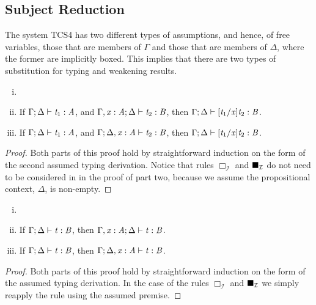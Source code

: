 \subsection{Subject Reduction}
\label{subsec:subject_reduction}
The system TCS4 has two different types of assumptions, and hence, of
free variables, those that are members of $\Gamma$ and those that are
members of $\Delta$, where the former are implicitly boxed.  This
implies that there are two types of substitution for typing and
weakening results.
\begin{lemma}
  \label{lemma:substitution_for_typing}
  \begin{enumerate}[i.]
  \item[] 
  \item If $\Gamma  ;  \Delta  \vdash  \mathit{t_{{\mathrm{1}}}}  :  \mathit{A}$, and $\Gamma  ,  \mathit{x}  :  \mathit{A}  ;  \Delta  \vdash  \mathit{t_{{\mathrm{2}}}}  :  \mathit{B}$, then $\Gamma  ;  \Delta  \vdash  [  \mathit{t_{{\mathrm{1}}}}  /  \mathit{x}  ]  \mathit{t_{{\mathrm{2}}}}  :  \mathit{B}$.
  \item If $\Gamma  ;  \Delta  \vdash  \mathit{t_{{\mathrm{1}}}}  :  \mathit{A}$, and $\Gamma  ;  \Delta  ,  \mathit{x}  :  \mathit{A}  \vdash  \mathit{t_{{\mathrm{2}}}}  :  \mathit{B}$, then $\Gamma  ;  \Delta  \vdash  [  \mathit{t_{{\mathrm{1}}}}  /  \mathit{x}  ]  \mathit{t_{{\mathrm{2}}}}  :  \mathit{B}$.
  \end{enumerate}
\end{lemma}
\begin{proof}
  Both parts of this proof hold by straightforward induction on the
  form of the second assumed typing derivation.  Notice that rules
  $\Box_{\mathcal{I}}$ and $\blacksquare_{\mathcal{I}}$ do not need to be
  considered in in the proof of part two, because we assume the
  propositional context, $\Delta$, is non-empty.
\end{proof}

\begin{lemma}[Weakening]
  \label{lemma:weakening}
  \begin{enumerate}[i.]
  \item[]
  \item If $\Gamma  ;  \Delta  \vdash  \mathit{t}  :  \mathit{B}$, then $\Gamma  ,  \mathit{x}  :  \mathit{A}  ;  \Delta  \vdash  \mathit{t}  :  \mathit{B}$.
  \item If $\Gamma  ;  \Delta  \vdash  \mathit{t}  :  \mathit{B}$, then $\Gamma  ;  \Delta  ,  \mathit{x}  :  \mathit{A}  \vdash  \mathit{t}  :  \mathit{B}$.
  \end{enumerate}
\end{lemma}
\begin{proof}
  Both parts of this proof hold by straightforward induction on the
  form of the assumed typing derivation.  In the case of the rules
  $\Box_{\mathcal{I}}$ and $\blacksquare_{\mathcal{I}}$ we simply reapply the
  rule using the assumed premise.
\end{proof}

